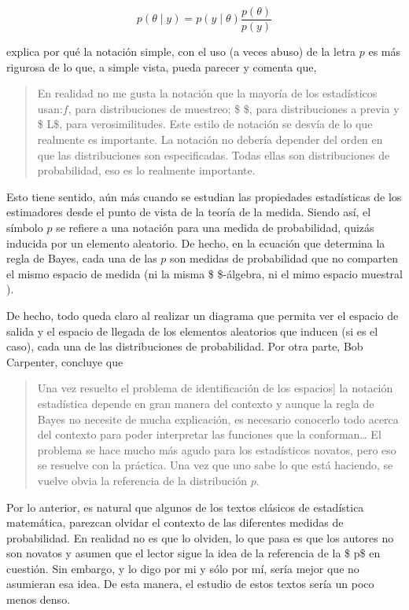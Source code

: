 \documentclass[
  spanish,
  letter]{book}
\theoremstyle{definition}
\theoremstyle{definition}
\theoremstyle{definition}
\theoremstyle{remark}
\begin{document}
\[p(\theta \mid y)=p(y \mid \theta)\frac{p(\theta)}{p(y)}\]

 explica por qué la notación simple, con el uso (a veces abuso) de la letra \(p\) es más rigurosa de lo que, a simple vista, pueda parecer y comenta que,

\begin{quote}
En realidad no me gusta la notación que la mayoría de los estadísticos usan:\(f\), para distribuciones de muestreo; \$ \pi\$, para distribuciones a previa y \$ L\$, para verosimilitudes. Este estilo de notación se desvía de lo que realmente es importante. La notación no debería depender del orden en que las distribuciones son especificadas. Todas ellas son distribuciones de probabilidad, eso es lo realmente importante.
\end{quote}

Esto tiene sentido, aún más cuando se estudian las propiedades estadísticas de los estimadores desde el punto de vista de la teoría de la medida. Siendo así, el símbolo \(p\) se refiere a una notación para una medida de probabilidad, quizás inducida por un elemento aleatorio. De hecho, en la ecuación que determina la regla de Bayes, cada una de las \(p\) son medidas de probabilidad que no comparten el mismo espacio de medida (ni la misma \$ \sigma\$-álgebra, ni el mimo espacio muestral ).

De hecho, todo queda claro al realizar un diagrama que permita ver el espacio de salida y el espacio de llegada de los elementos aleatorios que inducen (si es el caso), cada una de las distribuciones de probabilidad. Por otra parte, Bob Carpenter, concluye que

\begin{quote}
Una vez resuelto el problema de identificación de los espacios{]} la notación estadística depende en gran manera del contexto y aunque la regla de Bayes no necesite de mucha explicación, es necesario conocerlo todo acerca del contexto para poder interpretar las funciones que la conforman\ldots{} El problema se hace mucho más agudo para los estadísticos novatos, pero eso se resuelve con la práctica. Una vez que uno sabe lo que está haciendo, se vuelve obvia la referencia de la distribución \(p\).
\end{quote}

Por lo anterior, es natural que algunos de los textos clásicos de estadística matemática, parezcan olvidar el contexto de las diferentes medidas de probabilidad. En realidad no es que lo olviden, lo que pasa es que los autores no son novatos y asumen que el lector sigue la idea de la referencia de la \$ p\$ en cuestión. Sin embargo, y lo digo por mi y sólo por mí, sería mejor que no asumieran esa idea. De esta manera, el estudio de estos textos sería un poco menos denso.

  
\end{document}
